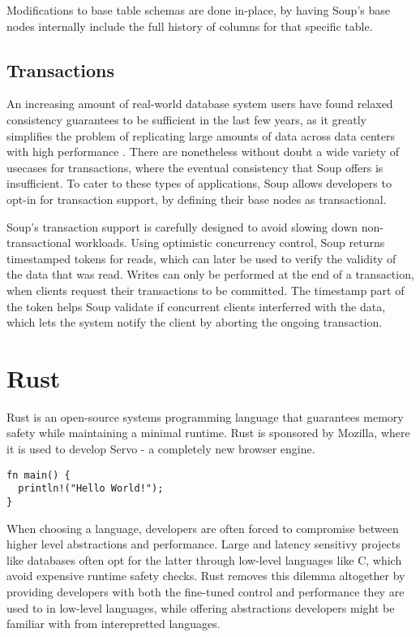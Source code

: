 \documentclass[b5paper]{report}
\begin{document}
Modifications to base table schemas are done in-place, by having Soup's base
nodes internally include the full history of columns for that specific table.

\subsection{Transactions}
An increasing amount of real-world database system users have found relaxed
consistency guarantees to be sufficient in the last few years, as it greatly
simplifies the problem of replicating large amounts of data across data centers
with high performance \cite{existential}. There are nonetheless without doubt
a wide variety of usecases for transactions, where the eventual consistency that
Soup offers is insufficient. To cater to these types of applications, Soup
allows developers to opt-in for transaction support, by defining their base
nodes as transactional.

Soup's transaction support is carefully designed to avoid slowing down
non-transactional workloads. Using optimistic concurrency control, Soup returns
timestamped tokens for reads, which can later be used to verify the validity of
the data that was read. Writes can only be performed at the end of a
transaction, when clients request their transactions to be committed. The
timestamp part of the token helps Soup validate if concurrent clients
interferred with the data, which lets the system notify the client by aborting
the ongoing transaction.

\section{Rust}
Rust \cite{rust} is an open-source systems programming language that guarantees memory
safety while maintaining a minimal runtime. Rust is sponsored by Mozilla, where
it is used to develop Servo - a completely new browser engine.

\begin{lstlisting}[caption="Hello World in Rust"]
fn main() {
  println!("Hello World!");
}
\end{lstlisting}

When choosing a language, developers are often forced to compromise between
higher level abstractions and performance. Large and latency sensitivy projects
like databases often opt for the latter through low-level languages like C,
which avoid expensive runtime safety checks. Rust removes this dilemma
altogether by providing developers with both the fine-tuned control and
performance they are used to in low-level languages, while offering abstractions
developers might be familiar with from interepretted languages.
\end{document}
